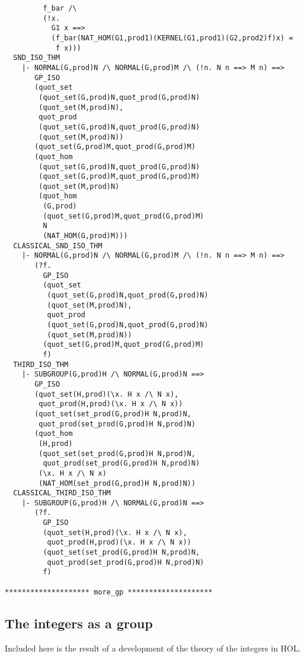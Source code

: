 \begin{verbatim}
         f_bar /\
         (!x.
           G1 x ==>
           (f_bar(NAT_HOM(G1,prod1)(KERNEL(G1,prod1)(G2,prod2)f)x) =
            f x)))
  SND_ISO_THM
    |- NORMAL(G,prod)N /\ NORMAL(G,prod)M /\ (!n. N n ==> M n) ==>
       GP_ISO
       (quot_set
        (quot_set(G,prod)N,quot_prod(G,prod)N)
        (quot_set(M,prod)N),
        quot_prod
        (quot_set(G,prod)N,quot_prod(G,prod)N)
        (quot_set(M,prod)N))
       (quot_set(G,prod)M,quot_prod(G,prod)M)
       (quot_hom
        (quot_set(G,prod)N,quot_prod(G,prod)N)
        (quot_set(G,prod)M,quot_prod(G,prod)M)
        (quot_set(M,prod)N)
        (quot_hom
         (G,prod)
         (quot_set(G,prod)M,quot_prod(G,prod)M)
         N
         (NAT_HOM(G,prod)M)))
  CLASSICAL_SND_ISO_THM
    |- NORMAL(G,prod)N /\ NORMAL(G,prod)M /\ (!n. N n ==> M n) ==>
       (?f.
         GP_ISO
         (quot_set
          (quot_set(G,prod)N,quot_prod(G,prod)N)
          (quot_set(M,prod)N),
          quot_prod
          (quot_set(G,prod)N,quot_prod(G,prod)N)
          (quot_set(M,prod)N))
         (quot_set(G,prod)M,quot_prod(G,prod)M)
         f)
  THIRD_ISO_THM
    |- SUBGROUP(G,prod)H /\ NORMAL(G,prod)N ==>
       GP_ISO
       (quot_set(H,prod)(\x. H x /\ N x),
        quot_prod(H,prod)(\x. H x /\ N x))
       (quot_set(set_prod(G,prod)H N,prod)N,
        quot_prod(set_prod(G,prod)H N,prod)N)
       (quot_hom
        (H,prod)
        (quot_set(set_prod(G,prod)H N,prod)N,
         quot_prod(set_prod(G,prod)H N,prod)N)
        (\x. H x /\ N x)
        (NAT_HOM(set_prod(G,prod)H N,prod)N))
  CLASSICAL_THIRD_ISO_THM
    |- SUBGROUP(G,prod)H /\ NORMAL(G,prod)N ==>
       (?f.
         GP_ISO
         (quot_set(H,prod)(\x. H x /\ N x),
          quot_prod(H,prod)(\x. H x /\ N x))
         (quot_set(set_prod(G,prod)H N,prod)N,
          quot_prod(set_prod(G,prod)H N,prod)N)
         f)
  
******************** more_gp ********************

\end{verbatim}

\subsection{The integers as a group}
Included here is the result of a development of the theory of the integers
in HOL.

